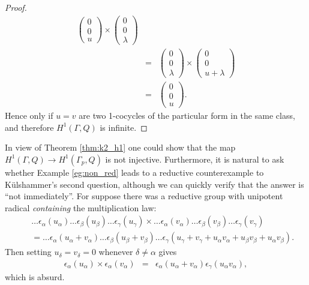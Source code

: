 \begin{proof}
\begin{eqnarray*}
		\left(\begin{matrix} 0 \\ 0 \\ u\end{matrix}\right) \times
		\left(\begin{matrix} 0 \\ 0 \\ \lambda\end{matrix}\right)\\
		&=&
		\left(\begin{matrix} 0 \\ 0 \\ \lambda\end{matrix}\right) \times
		\left(\begin{matrix} 0 \\ 0 \\ u + \lambda\end{matrix}\right) \\
		&=&
		\left(\begin{matrix} 0 \\ 0 \\ u\end{matrix}\right).
	\end{eqnarray*}
	Hence only if $u=v$ are two 1-cocycles of the particular form in the same class, and therefore $H^1(\Gamma, Q)$ is infinite.
\end{proof}

In view of Theorem \ref{thm:k2_h1} one could show that the map $H^1(\Gamma, Q) \rightarrow H^1(\Gamma_p, Q)$ is not injective. Furthermore, it is natural to ask whether Example \ref{eg:non_red} leads to a reductive counterexample to K\"ulshammer's second question, although we can quickly verify that the answer is ``not immediately''. For suppose there was a reductive group with unipotent radical \emph{containing} the multiplication law:
\begin{eqnarray*}
	&&\ldots \epsilon_\alpha(u_\alpha) \ldots \epsilon_\beta(u_\beta) \ldots \epsilon_\gamma(u_\gamma) \times
	\ldots \epsilon_\alpha(v_\alpha) \ldots \epsilon_\beta(v_\beta) \ldots \epsilon_\gamma(v_\gamma)\\
	&&=
	\ldots \epsilon_\alpha(u_\alpha + v_\alpha) \ldots \epsilon_\beta(u_\beta + v_\beta) \ldots \epsilon_\gamma(u_\gamma + v_\gamma + u_\alpha v_\alpha + u_\beta v_\beta + u_\alpha v_\beta).
\end{eqnarray*}
Then setting $u_\delta = v_\delta = 0$ whenever $\delta \neq \alpha$ gives
\begin{eqnarray*}
	\epsilon_\alpha(u_\alpha) \times \epsilon_\alpha(v_\alpha) &=& \epsilon_\alpha(u_\alpha + v_\alpha) \epsilon_\gamma(u_\alpha v_\alpha),
\end{eqnarray*}
which is absurd.


